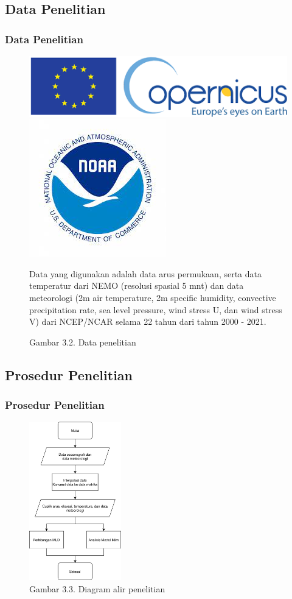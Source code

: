 \documentclass{beamer}
\begin{document}
\subsection{Data Penelitian}
\begin{frame}
	\frametitle{Data Penelitian}
	\begin{figure}[H]
		\centering
		\includegraphics[width=.5\textwidth]{logo_cmmes.png}
		\\[\smallskipamount]
		\includegraphics[width=.24\textwidth]{logo_ncep.jpeg}
		\captionsetup{labelformat=empty}
		\caption{Gambar 3.2. Data penelitian}
		\label{fig:data}
		\tiny
		Data yang digunakan adalah data arus permukaan, serta data temperatur dari NEMO (resolusi spasial 5 mnt) dan data meteorologi (2m air temperature, 2m specific
		humidity, convective precipitation rate, sea level pressure, wind stress U, dan wind
		stress V) dari NCEP/NCAR selama 22 tahun dari tahun 2000 - 2021. 
	\end{figure}
\end{frame}

\subsection{Prosedur Penelitian}
\begin{frame}
	\frametitle{Prosedur Penelitian}
	\begin{figure}[H]
		\centering
		\includegraphics[width=4cm]{flowchart.png}
		\captionsetup{labelformat=empty}
		\caption{Gambar 3.3. Diagram alir penelitian}
		\label{fig:flowchart}
	\end{figure}
\end{frame}
\end{document}
